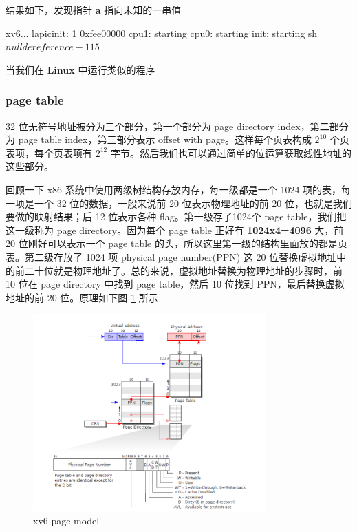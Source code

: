 结果如下，发现指针 \textbf{a} 指向未知的一串值

\begin{textcode}
    xv6...
    lapicinit: 1 0xfee00000
    cpu1: starting
    cpu0: starting
    init: starting sh
    $ nulldereference
    -115
    $ 
\end{textcode}

当我们在 \textbf{Linux} 中运行类似的程序


\subsubsection{page table}

32 位无符号地址被分为三个部分，第一个部分为 page directory index，第二部分为 page table index，第三部分表示 offset with page。这样每个页表构成 $2^{10}$ 个页表项，每个页表项有 $2^{12}$ 字节。然后我们也可以通过简单的位运算获取线性地址的这些部分。

回顾一下 x86 系统中使用两级树结构存放内存，每一级都是一个 1024 项的表，每一项是一个 32 位的数据，一般来说前 20 位表示物理地址的前 20 位，也就是我们要做的映射结果；后 12 位表示各种 flag。第一级存了1024个 page table，我们把这一级称为 page directory。因为每个 page table 正好有 \textbf{1024x4=4096} 大，前 20 位刚好可以表示一个 page table 的头，所以这里第一级的结构里面放的都是页表。第二级存放了 1024 项 physical page number(PPN) 这 20 位替换虚拟地址中的前二十位就是物理地址了。总的来说，虚拟地址替换为物理地址的步骤时，前 10 位在 page directory 中找到 page table，然后 10 位找到 PPN，最后替换虚拟地址的前 20 位。原理如下图 \ref{fig:1} 所示

\begin{figure}[h]
    \centering
    \includegraphics[width=0.8\textwidth]{img/pagemodel.PNG}
    \caption{xv6 page model}
    \label{fig:1}
\end{figure}

